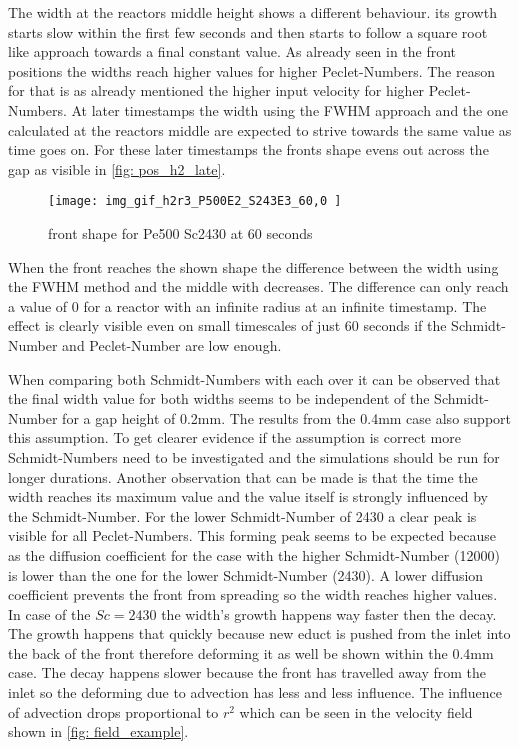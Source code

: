 \documentclass[../thesis.tex]{subfiles}
\begin{document}
The width at the reactors middle height shows a different behaviour. its growth starts slow within the first few seconds and then starts to follow a square root like approach towards a final constant value. As already seen in the front positions the widths reach higher values for higher Peclet-Numbers. The reason for that is as already mentioned the higher input velocity for higher Peclet-Numbers. At later timestamps the width using the FWHM approach and the one calculated at the reactors middle are expected to strive towards the same value as time goes on. For these later timestamps the fronts shape evens out across the gap as visible in \autoref{fig: pos_h2_late}.
\begin{figure}[htb]
	\centering
	\texttt{[image: img\_gif\_h2r3\_P500E2\_S243E3\_60,0 ]}
	\caption{front shape for Pe500 Sc2430 at 60 seconds}
	\label{fig: pos_h2_late}
\end{figure}
When the front reaches the shown shape the difference between the width using the FWHM method and the middle with decreases. The difference can only reach a value of 0 for a reactor with an infinite radius at an infinite timestamp. The effect is clearly visible even on small timescales of just 60 seconds if the Schmidt-Number and Peclet-Number are low enough.

When comparing both Schmidt-Numbers with each over it can be observed that the final width value for both widths seems to be independent of the Schmidt-Number for a gap height of 0.2mm. The results from the 0.4mm case also support this assumption. To get clearer evidence if the assumption is correct more Schmidt-Numbers need to be investigated and the simulations should be run for longer durations.
Another observation that can be made is that the time the width reaches its maximum value and the value itself is strongly influenced by the Schmidt-Number. For the lower Schmidt-Number of 2430 a clear peak is visible for all Peclet-Numbers. This forming peak seems to be expected because as the diffusion coefficient for the case with the higher Schmidt-Number (12000) is lower than the one for the lower Schmidt-Number (2430). A lower diffusion coefficient prevents the front from spreading so the width reaches higher values. In case of the $Sc = 2430$ the width's growth happens way faster then the decay. The growth happens that quickly because new educt is pushed from the inlet into the back of the front therefore deforming it as well be shown within the 0.4mm case. The decay happens slower because the front has travelled away from the inlet so the deforming due to advection has less and less influence. The influence of advection drops proportional to $r^2$ which can be seen in the velocity field shown in \autoref{fig: field_example}. 
\newline
\end{document}
